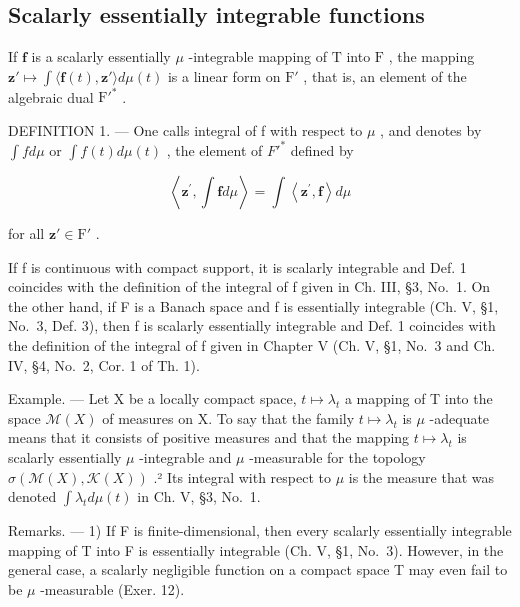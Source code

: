 \subsection{Scalarly essentially integrable functions}

If \(\mathbf{f}\) is a scalarly essentially \(\mu\) -integrable mapping of \(\mathrm{T}\) into \(\mathrm{F}\) , the mapping \(\mathbf{z}' \mapsto \int \langle \mathbf{f}(t), \mathbf{z}' \rangle d\mu(t)\) is a linear form on \(\mathrm{F}'\) , that is, an element of the algebraic dual \(\mathrm{F}'^*\) .

DEFINITION 1. --- One calls integral of f with respect to \(\mu\) , and denotes by \(\int f d\mu\) or \(\int f(t) d\mu(t)\) , the element of \(F'^{*}\) defined by

\[
\left\langle \mathbf {z} ^ {\prime}, \int \mathbf {f} d \mu \right\rangle = \int \left\langle \mathbf {z} ^ {\prime}, \mathbf {f} \right\rangle d \mu
\]

for all \(\mathbf{z}' \in \mathrm{F}'\) .

If f is continuous with compact support, it is scalarly integrable and Def. 1 coincides with the definition of the integral of f given in Ch. III, §3, No.~1. On the other hand, if F is a Banach space and f is essentially integrable (Ch. V, §1, No.~3, Def. 3), then f is scalarly essentially integrable and Def. 1 coincides with the definition of the integral of f given in Chapter V (Ch. V, §1, No.~3 and Ch. IV, §4, No.~2, Cor. 1 of Th. 1).

Example. --- Let X be a locally compact space, \(t \mapsto \lambda_{t}\) a mapping of T into the space \(\mathcal{M}(X)\) of measures on X. To say that the family \(t \mapsto \lambda_{t}\) is \(\mu\) -adequate means that it consists of positive measures and that the mapping \(t \mapsto \lambda_{t}\) is scalarly essentially \(\mu\) -integrable and \(\mu\) -measurable for the topology \(\sigma(\mathcal{M}(X), \mathcal{K}(X))\) .² Its integral with respect to \(\mu\) is the measure that was denoted \(\int \lambda_t d\mu(t)\) in Ch. V, §3, No.~1.

Remarks. --- 1) If F is finite-dimensional, then every scalarly essentially integrable mapping of T into F is essentially integrable (Ch. V, §1, No.~3). However, in the general case, a scalarly negligible function on a compact space T may even fail to be \(\mu\) -measurable (Exer. 12).

